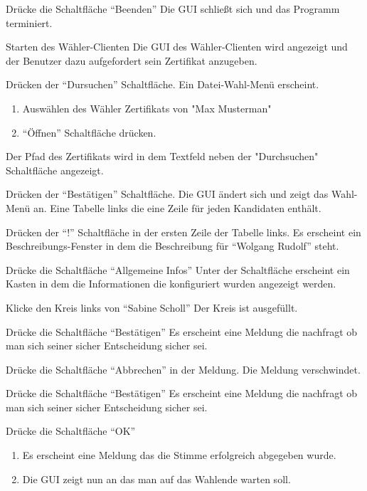 \documentclass[parskip=full]{scrartcl}
\begin{document}
\teststep{}
		{Drücke die Schaltfläche \enquote{Beenden}}
		{Die GUI schließt sich und das Programm terminiert.}

\teststep{}
		{Starten des Wähler-Clienten}
		{Die GUI des Wähler-Clienten wird angezeigt und der Benutzer dazu aufgefordert sein Zertifikat anzugeben.}

\teststep{}
		{Drücken der \enquote{Dursuchen} Schaltfläche.}
		{Ein Datei-Wahl-Menü erscheint.}
	
\teststep{}
		{\begin{enumerate}
				\item Auswählen des Wähler Zertifikats von "Max Musterman"
				\item \enquote{Öffnen} Schaltfläche drücken.
		\end{enumerate}}
		{Der Pfad des Zertifikats wird in dem Textfeld neben der "Durchsuchen" Schaltfläche angezeigt.}
		
\teststep{}
		{Drücken der \enquote{Bestätigen} Schaltfläche.}
		{Die GUI ändert sich und zeigt das Wahl-Menü an. Eine Tabelle links die eine Zeile für jeden Kandidaten enthält.}

\teststep{}
		{Drücken der \enquote{!} Schaltfläche in der ersten Zeile der Tabelle links.}
		{Es erscheint ein Beschreibungs-Fenster in dem die Beschreibung für \enquote{Wolgang Rudolf} steht.}

\teststep{}
		{Drücke die Schaltfläche \enquote{Allgemeine Infos}}
		{Unter der Schaltfläche erscheint ein Kasten in dem die Informationen die konfiguriert wurden angezeigt werden.}

\teststep{}
		{Klicke den Kreis links von \enquote{Sabine Scholl}}
		{Der Kreis ist ausgefüllt.}
	
\teststep{}
		{Drücke die Schaltfläche \enquote{Bestätigen}}
		{Es erscheint eine Meldung die nachfragt ob man sich seiner sicher Entscheidung sicher sei.}

\teststep{}
		{Drücke die Schaltfläche \enquote{Abbrechen} in der Meldung.}
		{Die Meldung verschwindet.}
			

\teststep{}
		{Drücke die Schaltfläche \enquote{Bestätigen}}
		{Es erscheint eine Meldung die nachfragt ob man sich seiner sicher Entscheidung sicher sei.}

\teststep{}
		{Drücke die Schaltfläche \enquote{OK}}
		{\begin{enumerate}
			\item Es erscheint eine Meldung das die Stimme erfolgreich abgegeben wurde.
			\item Die GUI zeigt nun an das man auf das Wahlende warten soll.
		\end{enumerate}}
\end{document}
